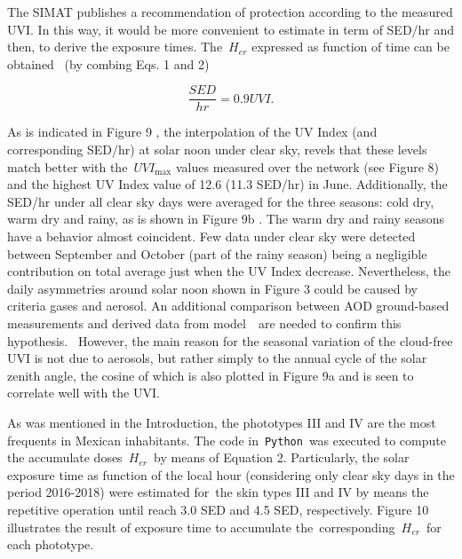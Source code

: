 \documentclass{article}
\begin{document}
The SIMAT publishes a recommendation of protection according to the
measured UVI. In this way, it would be more convenient to estimate in
term of SED/hr and then, to derive the exposure times.
The~\(H_{er}\) expressed as function of time can be obtained~
(by combing Eqs. 1 and 2)

\begin{equation}
\frac{SED}{hr}=0.9UVI.    
\end{equation}

As is indicated in
Figure 9%
, the interpolation of the UV
Index (and corresponding SED/hr) at solar noon under clear sky, revels
that these levels match better with the~\(UVI_{\max}\) values
measured over the network (see Figure 8) %
and the highest UV Index value of 12.6 (11.3 SED/hr) in June.
Additionally, the SED/hr under all clear sky days were averaged for the
three seasons: cold dry, warm dry and rainy, as is shown in
Figure 9b%
. The warm dry and rainy seasons
have a behavior almost coincident. Few data under clear sky were
detected between September and October (part of the rainy season) being
a negligible contribution on total average just when the UV Index
decrease. Nevertheless, the daily asymmetries around solar noon shown in
Figure 3 %
could be caused by criteria gases
and aerosol. An additional comparison between AOD ground-based
measurements and derived data from model~\cite{Castro_2001,Cabrera_2012,Palancar_2012}~are needed
to confirm this hypothesis.~ However, the main reason for the seasonal
variation of the cloud-free UVI is not due to aerosols, but rather
simply to the annual cycle of the solar zenith angle, the cosine of
which is also plotted in Figure 9a %
and is seen to correlate well with the UVI. ~

As was mentioned in the Introduction, the phototypes III and IV are the
most frequents in Mexican inhabitants. The code in~\texttt{Python}~was
executed to compute the accumulate doses~\(H_{er}\)~by means of
Equation 2. Particularly, the solar exposure time as function of the
local hour (considering only clear sky days in the period 2016-2018)
were estimated for~the skin types III and IV by means the repetitive
operation until reach 3.0 SED and 4.5 SED, respectively.
Figure 10 %
illustrates the result of
exposure time to accumulate the~corresponding~\(H_{er}\)~for
each phototype.
\end{document}
